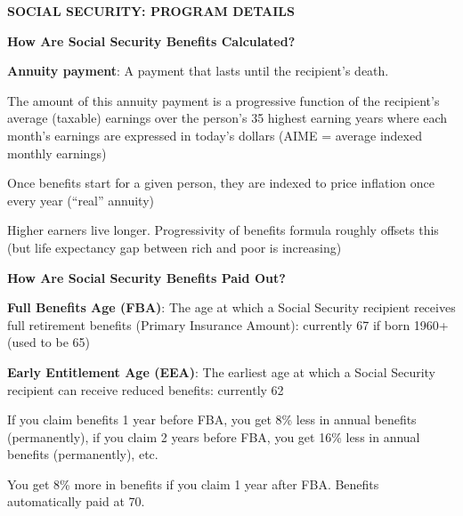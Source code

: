 \documentclass[landscape]{slides}
\begin{document}
\begin{slide}
\begin{center}
{\bf SOCIAL SECURITY: PROGRAM DETAILS}
\end{center}

{\bf How Are Social Security Benefits Calculated?}

{\bf Annuity payment}:
A payment that lasts until the recipient's death.

The amount of this annuity payment is a progressive function of the recipient's average (taxable) earnings over the person's 35 highest earning years where each month's earnings are expressed in today's dollars (AIME = average indexed monthly earnings)

Once benefits start for a given person, they are indexed to price inflation once every year (``real'' annuity)

Higher earners live longer. Progressivity of benefits formula roughly offsets this (but life expectancy gap between rich and poor is increasing)
\end{slide}





\begin{slide}

\end{slide}


\begin{slide}

\end{slide}

\begin{slide}
\begin{center}
{\bf How Are Social Security Benefits Paid Out?}
\end{center}

{\bf Full Benefits Age (FBA)}:
The age at which a Social Security recipient receives full retirement benefits (Primary Insurance Amount):
currently 67 if born 1960+ (used to be 65)

{\bf Early Entitlement Age (EEA)}:
The earliest age at which a Social Security recipient can receive reduced benefits: currently 62

If you claim benefits 1 year before FBA, you get 8\% less in annual benefits (permanently), if you claim
2 years before FBA, you get 16\% less in annual benefits (permanently), etc.

You get 8\% more in benefits if you claim 1 year after FBA. Benefits automatically paid at 70.

\end{slide}
\end{document}
